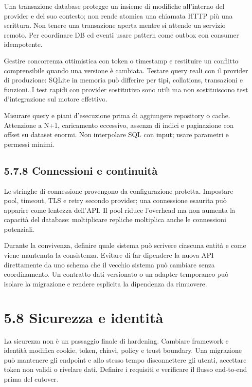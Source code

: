 \documentclass[
  italian,
  10pt,
]{book}
\begin{document}
Una transazione database protegge un insieme di modifiche all'interno
del provider e del suo contesto; non rende atomica una chiamata HTTP più
una scrittura. Non tenere una transazione aperta mentre si attende un
servizio remoto. Per coordinare DB ed eventi usare pattern come outbox
con consumer idempotente.

Gestire concorrenza ottimistica con token o timestamp e restituire un
conflitto comprensibile quando una versione è cambiata. Testare query
reali con il provider di produzione: SQLite in memoria può differire per
tipi, collations, transazioni e funzioni. I test rapidi con provider
sostitutivo sono utili ma non sostituiscono test d'integrazione sul
motore effettivo.

Misurare query e piani d'esecuzione prima di aggiungere repository o
cache. Attenzione a N+1, caricamento eccessivo, assenza di indici e
paginazione con offset su dataset enormi. Non interpolare SQL con input;
usare parametri e permessi minimi.

\subsection{5.7.8 Connessioni e
continuità}\label{connessioni-e-continuituxe0}

Le stringhe di connessione provengono da configurazione protetta.
Impostare pool, timeout, TLS e retry secondo provider; una connessione
esaurita può apparire come lentezza dell'API. Il pool riduce l'overhead
ma non aumenta la capacità del database: moltiplicare repliche
moltiplica anche le connessioni potenziali.

Durante la convivenza, definire quale sistema può scrivere ciascuna
entità e come viene mantenuta la consistenza. Evitare di far dipendere
la nuova API direttamente da uno schema che il vecchio sistema può
cambiare senza coordinamento. Un contratto dati versionato o un adapter
temporaneo può isolare la migrazione e rendere esplicita la dipendenza
da rimuovere.

\section{5.8 Sicurezza e identità}\label{sicurezza-e-identituxe0}

La sicurezza non è un passaggio finale di hardening. Cambiare framework
e identità modifica cookie, token, chiavi, policy e trust boundary. Una
migrazione può mantenere gli endpoint e allo stesso tempo disconnettere
gli utenti, accettare token non validi o rivelare dati. Definire i
requisiti e verificare il flusso end-to-end prima del cutover.
\end{document}
